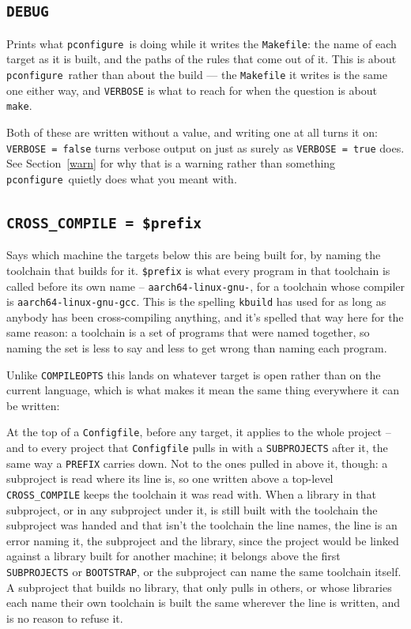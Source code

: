 \documentclass{article}
\newcommand{\pconfigure}{\texttt{pconfigure}}
\begin{document}
\subsection{\texttt{DEBUG} \label{cmd:debug}}

Prints what \pconfigure\ is doing while it writes the
\texttt{Makefile}: the name of each target as it is built, and the
paths of the rules that come out of it.  This is about \pconfigure\
rather than about the build --- the \texttt{Makefile} it writes is the
same one either way, and \texttt{VERBOSE} is what to reach for when
the question is about \texttt{make}.

Both of these are written without a value, and writing one at all
turns it on: \texttt{VERBOSE = false} turns verbose output on just as
surely as \texttt{VERBOSE = true} does.  See Section~\ref{warn} for
why that is a warning rather than something \pconfigure\ quietly
does what you meant with.

\subsection{\texttt{CROSS\_COMPILE = \$prefix} \label{cmd:cross_compile}}

Says which machine the targets below this are being built for, by
naming the toolchain that builds for it.  \texttt{\$prefix} is what
every program in that toolchain is called before its own name --
\texttt{aarch64-linux-gnu-}, for a toolchain whose compiler is
\texttt{aarch64-linux-gnu-gcc}.  This is the spelling \texttt{kbuild}
has used for as long as anybody has been cross-compiling anything, and
it's spelled that way here for the same reason: a toolchain is a set of
programs that were named together, so naming the set is less to say
and less to get wrong than naming each program.

Unlike \texttt{COMPILEOPTS} this lands on whatever target is open
rather than on the current language, which is what makes it mean the
same thing everywhere it can be written:

At the top of a \texttt{Configfile}, before any target, it applies to
the whole project -- and to every project that \texttt{Configfile}
pulls in with a \texttt{SUBPROJECTS} after it, the same way a
\texttt{PREFIX} carries down.  Not to the ones pulled in above it,
though: a subproject is read where its line is, so one written above
a top-level \texttt{CROSS\_COMPILE} keeps the toolchain it was read
with.  When a library in that subproject, or in any subproject under
it, is still built with the toolchain the subproject was handed and
that isn't the toolchain the line names, the line is an error naming
it, the subproject and the library, since the project would be linked
against a library built for another machine; it belongs above the
first \texttt{SUBPROJECTS} or \texttt{BOOTSTRAP}, or the subproject
can name the same toolchain itself.  A subproject that builds no
library, that only pulls in others, or whose libraries each name
their own toolchain is built the same wherever the line is written,
and is no reason to refuse it.
\end{document}
